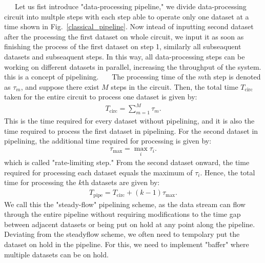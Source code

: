 \documentclass[a4paper,11pt]{ltjsarticle}
\begin{document}
{{        \ \ \ Let us fist introduce "data-processing pipeline," we divide data-processing circuit into multple steps with each step able to operate only one dataset at a time shown in Fig.~\ref{classical_pipeline}. Now intead of inputting second dataset after the processing the first dataset on whole circuit, we input it as soon as finishing the process of the first dataset on step 1, similarly all subseaquent datasets and subseaquent steps. In this way, all data-processing steps can be working on different datasets in parallel, increasing the throughput of the system. this is a concept of pipelining. 
        \ \ \ The processing time of the $m$th step is denoted as $\tau_m$, and suppose there exist $M$ steps in the circuit. Then, the total time $T_{\text{circ}}$ taken for the entire circuit to process one dataset is given by:
        \begin{align}
            T_\text{circ}=\sum_{m=1}^M\tau_m.
        \end{align}
        This is the time required for every dataset without pipelining, and it is also the time required to process the first dataset in pipelining. For the second dataset in pipelining, the additional time required for processing is given by:
        \begin{align}
            \tau_\text{max}=\max_i{\tau_i}.
        \end{align}
        which is called "rate-limiting step." From the second dataset onward, the time required for processing each dataset equals the maximum of $\tau_i$. Hence, the total time for processing the $k$th datasets are given by:
        \begin{align}\label{pipeline_processing_time}
            T_\text{pipe}=T_\text{circ}+(k-1)\tau_\text{max}.
        \end{align}
        We call this the "steady-flow" pipelining scheme, as the data stream can flow through the entire pipeline without requiring modifications to the time gap between adjacent datasets or being put on hold at any point along the pipeline. Deviating from the steadyflow scheme, we often need to tempolary put the dataset on hold in the pipeline. For this, we need to implement "baffer" where multiple datasets can be on hold. 
    }
}
\end{document}
